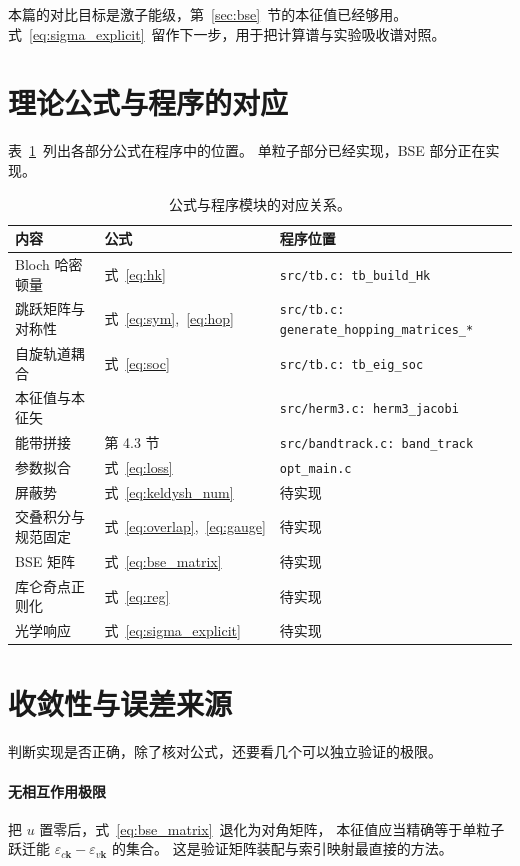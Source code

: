 \documentclass[11pt,a4paper]{ctexart}
\newcommand{\kk}{\mathbf{k}}
\newcommand{\eps}{\varepsilon}
\begin{document}
本篇的对比目标是激子能级，第~\ref{sec:bse}~节的本征值已经够用。
式~\eqref{eq:sigma_explicit}~留作下一步，用于把计算谱与实验吸收谱对照。

\newpage
\section{理论公式与程序的对应}

表~\ref{tab:map}~列出各部分公式在程序中的位置。
单粒子部分已经实现，BSE 部分正在实现。

\begin{table}[htbp]
\centering
\caption{公式与程序模块的对应关系。}
\label{tab:map}
\begin{tabular}{lll}
\toprule
内容 & 公式 & 程序位置\\
\midrule
Bloch 哈密顿量 & 式~\eqref{eq:hk} & \texttt{src/tb.c: tb\_build\_Hk}\\
跳跃矩阵与对称性 & 式~\eqref{eq:sym},~\eqref{eq:hop} & \texttt{src/tb.c: generate\_hopping\_matrices\_*}\\
自旋轨道耦合 & 式~\eqref{eq:soc} & \texttt{src/tb.c: tb\_eig\_soc}\\
本征值与本征矢 & & \texttt{src/herm3.c: herm3\_jacobi}\\
能带拼接 & 第 4.3 节 & \texttt{src/bandtrack.c: band\_track}\\
参数拟合 & 式~\eqref{eq:loss} & \texttt{opt\_main.c}\\
屏蔽势 & 式~\eqref{eq:keldysh_num} & 待实现\\
交叠积分与规范固定 & 式~\eqref{eq:overlap},~\eqref{eq:gauge} & 待实现\\
BSE 矩阵 & 式~\eqref{eq:bse_matrix} & 待实现\\
库仑奇点正则化 & 式~\eqref{eq:reg} & 待实现\\
光学响应 & 式~\eqref{eq:sigma_explicit} & 待实现\\
\bottomrule
\end{tabular}
\end{table}

\newpage
\section{收敛性与误差来源}

判断实现是否正确，除了核对公式，还要看几个可以独立验证的极限。

\paragraph{无相互作用极限}
把 $u$ 置零后，式~\eqref{eq:bse_matrix}~退化为对角矩阵，
本征值应当精确等于单粒子跃迁能 $\eps_{c\kk}-\eps_{v\kk}$ 的集合。
这是验证矩阵装配与索引映射最直接的方法。
\end{document}

